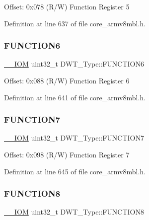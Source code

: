 Offset\+: 0x078 (R/W) Function Register 5 

Definition at line 637 of file core\+\_\+armv8mbl.\+h.

\mbox{\label{struct_d_w_t___type_aa8f49a707a5d85cf554b9bef54c19380}} 
\subsubsection{\texorpdfstring{F\+U\+N\+C\+T\+I\+O\+N6}{FUNCTION6}}
{\footnotesize\ttfamily \hyperlink{core__sc300_8h_ab6caba5853a60a17e8e04499b52bf691}{\+\_\+\+\_\+\+I\+OM} uint32\+\_\+t D\+W\+T\+\_\+\+Type\+::\+F\+U\+N\+C\+T\+I\+O\+N6}

Offset\+: 0x088 (R/W) Function Register 6 

Definition at line 641 of file core\+\_\+armv8mbl.\+h.

\mbox{\label{struct_d_w_t___type_ababf5d870650c4a480302b65bdb66741}} 
\subsubsection{\texorpdfstring{F\+U\+N\+C\+T\+I\+O\+N7}{FUNCTION7}}
{\footnotesize\ttfamily \hyperlink{core__sc300_8h_ab6caba5853a60a17e8e04499b52bf691}{\+\_\+\+\_\+\+I\+OM} uint32\+\_\+t D\+W\+T\+\_\+\+Type\+::\+F\+U\+N\+C\+T\+I\+O\+N7}

Offset\+: 0x098 (R/W) Function Register 7 

Definition at line 645 of file core\+\_\+armv8mbl.\+h.

\mbox{\label{struct_d_w_t___type_acdd6b87ea4bc95345687074c53098e75}} 
\subsubsection{\texorpdfstring{F\+U\+N\+C\+T\+I\+O\+N8}{FUNCTION8}}
{\footnotesize\ttfamily \hyperlink{core__sc300_8h_ab6caba5853a60a17e8e04499b52bf691}{\+\_\+\+\_\+\+I\+OM} uint32\+\_\+t D\+W\+T\+\_\+\+Type\+::\+F\+U\+N\+C\+T\+I\+O\+N8}

